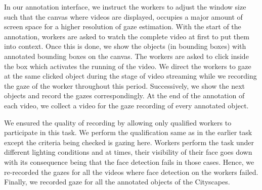 \documentclass[10pt,twocolumn,letterpaper]{article}
\begin{document}
In our annotation interface, we instruct the workers to adjust the window size such that the canvas where videos are displayed, occupies a major amount of screen space for a higher resolution of gaze estimation. 
With the start of the annotation, workers are asked to watch the complete video at first to put them into context.
Once this is done, we show the objects (in bounding boxes) with annotated bounding boxes on the canvas. The workers are asked to click inside the box which activates the running of the video. 
We direct the workers to gaze at the same clicked object during the stage of video streaming while we recording the gaze of the worker throughout this period. Successively, we show the next objects and record the gazes correspondingly. 
At the end of the annotation of each video, we collect a video for the gaze recording of every annotated object.

We ensured the quality of recording by allowing only qualified workers to participate in this task. We perform the qualification same as in the earlier task except the criteria being checked is gazing here. Workers perform the task under different lighting conditions and at times, their visibility of their face goes down with its consequence being that the face detection fails in those cases. Hence, we re-recorded the gazes for all the videos where face detection on the workers failed. Finally, we recorded gaze for all the annotated objects of the Cityscapes.
\end{document}
